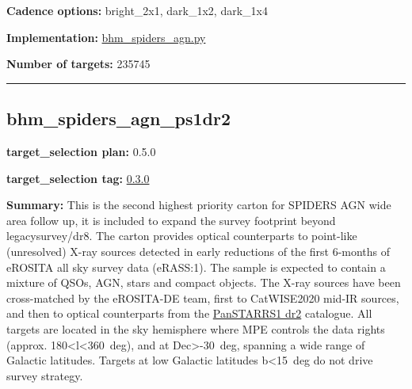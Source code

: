 \noindent\textbf{Cadence options:} bright\_2x1, dark\_1x2, dark\_1x4

\noindent\textbf{Implementation:}
\href{https://github.com/sdss/target_selection/blob/0.3.0/python/target_selection/cartons/bhm_spiders_agn.py}{bhm\_spiders\_agn.py}

\noindent\textbf{Number of targets:} 235745

\begin{center}\rule{0.5\linewidth}{0.5pt}\end{center}

\hypertarget{bhm_spiders_agn_ps1dr2_plan0.5.0}{%
\subsection{bhm\_spiders\_agn\_ps1dr2}\label{bhm_spiders_agn_ps1dr2_plan0.5.0}}

\noindent\textbf{target\_selection plan:} 0.5.0

\noindent\textbf{target\_selection tag:}
\href{https://github.com/sdss/target_selection/tree/0.3.0/}{0.3.0}

\noindent\textbf{Summary:} This is the second highest priority carton for SPIDERS
AGN wide area follow up, it is included to expand the survey footprint
beyond legacysurvey/dr8. The carton provides optical counterparts to
point-like (unresolved) X-ray sources detected in early reductions of
the first 6-months of eROSITA all sky survey data (eRASS:1). The sample
is expected to contain a mixture of QSOs, AGN, stars and compact
objects. The X-ray sources have been cross-matched by the eROSITA-DE
team, first to
CatWISE2020 \citep{Marocco2021}
mid-IR sources, and then to optical counterparts from the
\href{https://outerspace.stsci.edu/display/PANSTARRS/}{PanSTARRS1 dr2}
catalogue. All targets are located in the sky hemisphere where MPE
controls the data rights (approx. 180\textless l\textless360~deg), and
at Dec\textgreater-30~deg, spanning a wide range of Galactic latitudes.
Targets at low Galactic latitudes \textbar b\textbar\textless15~deg do
not drive survey strategy.

